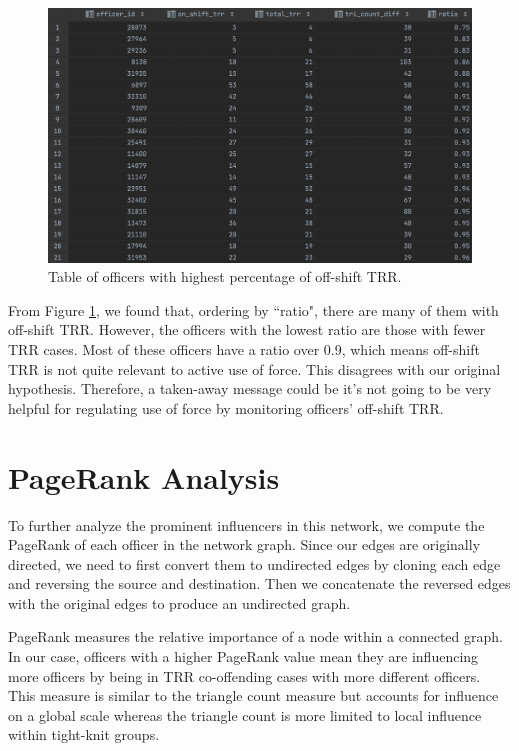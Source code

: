 \documentclass[10pt]{article}
\begin{document}
\begin{figure}[H]
\centering
\includegraphics[width=\textwidth]{offshift}
\caption{Table of officers with highest percentage of off-shift TRR.}
\label{offshift}
\end{figure}

From Figure \ref{offshift}, we found that, ordering by ``ratio", there are many of them with off-shift TRR. However, the officers with the lowest ratio are those with fewer TRR cases. Most of these officers have a ratio over 0.9, which means off-shift TRR is not quite relevant to active use of force. This disagrees with our original hypothesis. Therefore, a taken-away message could be it’s not going to be very helpful for regulating use of force by monitoring officers' off-shift TRR.




\section{PageRank Analysis}

To further analyze the prominent influencers in this network, we compute the PageRank of each officer in the network graph. Since our edges are originally directed, we need to first convert them to undirected edges by cloning each edge and reversing the source and destination. Then we concatenate the reversed edges with the original edges to produce an undirected graph.

PageRank measures the relative importance of a node within a connected graph. In our case, officers with a higher PageRank value mean they are influencing more officers by being in TRR co-offending cases with more different officers. This measure is similar to the triangle count measure but accounts for influence on a global scale whereas the triangle count is more limited to local influence within tight-knit groups.
\end{document}
